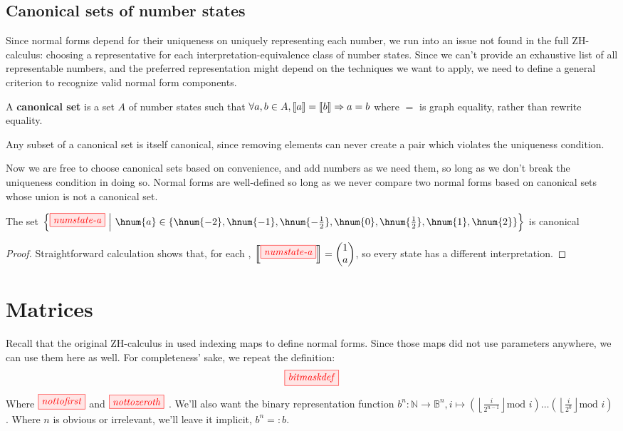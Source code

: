\subsection{Canonical sets of number states}\label{sec:canonsets}
Since normal forms depend for their uniqueness on uniquely representing each
number, we run into an issue not found in the full ZH-calculus: choosing a
representative for each interpretation-equivalence class of number states. Since
we can't provide an exhaustive list of all representable numbers, and the
preferred representation might depend on the techniques we want to apply, we
need to define a general criterion to recognize valid normal form components.
\begin{definition}
    A \textbf{canonical set} is a set $A$ of number states such that $\forall a,
    b \in A, \left\llbracket a \right\rrbracket = \left\llbracket b \right\rrbracket \Rightarrow a = b$ where $=$ is graph equality,
    rather than rewrite equality.
\end{definition}
\begin{remark}
    Any subset of a canonical set is itself canonical, since removing elements
    can never create a pair which violates the uniqueness condition.
\end{remark}

Now we are free to choose canonical sets based on convenience, and add numbers
as we need them, so long as we don't break the uniqueness condition in doing so.
Normal forms are well-defined so long as we never compare two normal forms based
on canonical sets whose union is not a canonical set.

\begin{lemma}\label{lem:canoncanon}
    The set $\left\{\tikzfig{numstate-a}\ \middle|\ \hnum{a} \in \{\hnum{-2}, \hnum{-1}, \hnum{-\frac{1}{2}}, \hnum{0},
    \hnum{\frac{1}{2}}, \hnum{1}, \hnum{2}\}\right\}$ is canonical
\end{lemma}
\begin{proof}
    Straightforward calculation shows that, for each ,
    $\intf{\tikzfig{numstate-a}} =
    \begin{pmatrix}
        1 \\
        a
    \end{pmatrix}$, so every state has a different interpretation.
\end{proof}




\section{Matrices}\label{sec:matrices}
Recall that the original ZH-calculus in \cite{backens2018zhcalculus} used
indexing maps to define normal forms.  Since those maps did not use parameters
anywhere, we can use them here as well.  For completeness' sake, we repeat the
definition:
$$\tikzfig{bitmaskdef}$$
Where $\tikzfig{nottofirst}$ and $\tikzfig{nottozeroth}$ . We'll also want the
binary representation function 
$b^n : \mathbb{N} \rightarrow \mathbb{B}^n, i \mapsto \left( \left \lfloor
\frac{i}{2^{n-1}}\right \rfloor \text{mod } i \right) \ldots \left( \left \lfloor
\frac{i}{2^{0}}\right \rfloor \text{mod } i \right)$ . Where $n$ is obvious or
irrelevant, we'll leave it implicit, $b^n =: b$.

